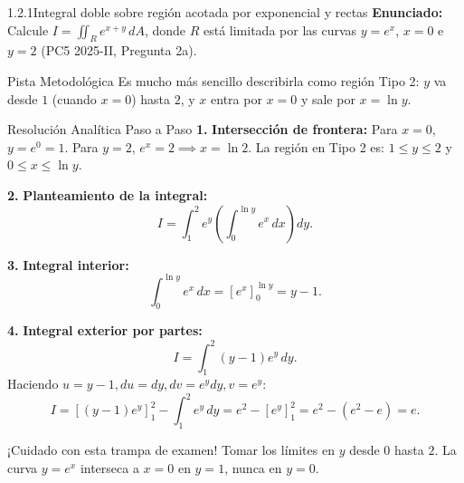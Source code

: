 \documentclass[11pt,a4paper]{article}
\begin{document}
\begin{nivelbox}{1.2.1}{Integral doble sobre región acotada por exponencial y rectas}
\textbf{Enunciado:}\\
Calcule $I = \iint_R e^{x+y} \, dA$, donde $R$ está limitada por las curvas $y = e^x$, $x = 0$ e $y = 2$ (PC5 2025-II, Pregunta 2a).

\begin{observacionbox}{Pista Metodológica}
Es mucho más sencillo describirla como región Tipo 2: $y$ va desde $1$ (cuando $x=0$) hasta $2$, y $x$ entra por $x = 0$ y sale por $x = \ln y$.
\end{observacionbox}

\begin{ejerciciobox}{Resolución Analítica Paso a Paso}
\smallskip\noindent\textbf{1.} \textbf{Intersección de frontera:}
Para $x = 0$, $y = e^0 = 1$. Para $y = 2$, $e^x = 2 \implies x = \ln 2$.
La región en Tipo 2 es: $1 \le y \le 2$ y $0 \le x \le \ln y$.

\smallskip\noindent\textbf{2.} \textbf{Planteamiento de la integral:}
\[I = \int_1^2 e^y \left( \int_0^{\ln y} e^x \, dx \right) dy.\]

\smallskip\noindent\textbf{3.} \textbf{Integral interior:}
\[\int_0^{\ln y} e^x \, dx = [e^x]_0^{\ln y} = y - 1.\]

\smallskip\noindent\textbf{4.} \textbf{Integral exterior por partes:}
\[I = \int_1^2 (y - 1) e^y \, dy.\]
Haciendo $u = y-1, du = dy, dv = e^y dy, v = e^y$:
\[I = \left[ (y - 1)e^y \right]_1^2 - \int_1^2 e^y \, dy = e^2 - [e^y]_1^2 = e^2 - (e^2 - e) = e.\]
\end{ejerciciobox}

\begin{errorbox}{¡Cuidado con esta trampa de examen!}
Tomar los límites en $y$ desde $0$ hasta $2$. La curva $y = e^x$ interseca a $x = 0$ en $y = 1$, nunca en $y = 0$.
\end{errorbox}
\end{nivelbox}
\bigskip
\end{document}
